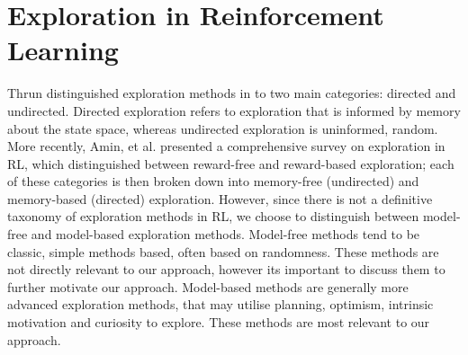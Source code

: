 \section{Exploration in Reinforcement Learning}
Thrun \cite{Thrun-1992-15850} distinguished exploration methods in to two main categories: directed and undirected. Directed exploration refers to exploration that is informed by memory about the state space, whereas undirected exploration is uninformed, random. More recently, Amin, et al. \cite{DBLP:journals/corr/abs-2109-00157} presented a comprehensive survey on exploration in RL, which distinguished between reward-free and reward-based exploration; each of these categories is then broken down into memory-free (undirected) and memory-based (directed) exploration.
However, since there is not a definitive taxonomy of exploration methods in RL, we choose to distinguish between model-free and model-based exploration methods. Model-free methods tend to be classic, simple methods based, often based on randomness. These methods are not directly relevant to our approach, however its important to discuss them to further motivate our approach.
Model-based methods are generally more advanced exploration methods, that may utilise planning, optimism, intrinsic motivation and curiosity to explore. These methods are most relevant to our approach.



